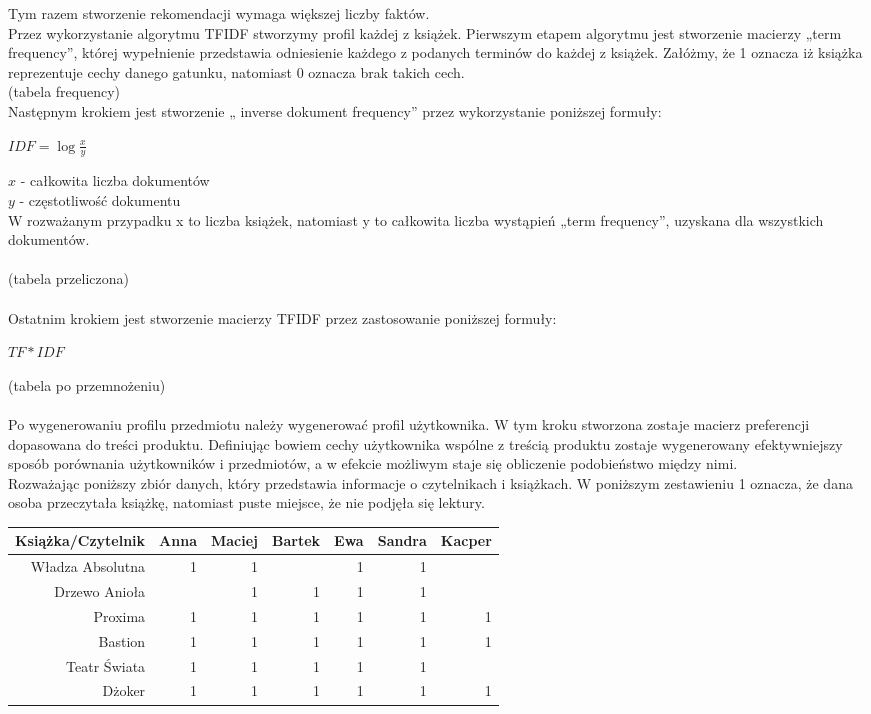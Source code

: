 \documentclass[12pt,a4paper]{report}
\begin{document}
Tym razem stworzenie rekomendacji wymaga większej liczby faktów.
\\Przez wykorzystanie algorytmu TFIDF stworzymy profil każdej z książek.
Pierwszym etapem algorytmu jest stworzenie macierzy „term frequency”, której wypełnienie przedstawia odniesienie każdego z podanych terminów do każdej z książek. Załóżmy, że 1 oznacza iż książka reprezentuje cechy danego gatunku, natomiast 0 oznacza brak takich cech. 
\\(tabela frequency)
\\Następnym krokiem jest stworzenie „ inverse dokument frequency” przez wykorzystanie poniższej formuły:
\begin{center}
$IDF = \log \frac{x}{y}$
\end{center}
$x$ - całkowita liczba dokumentów
\\$y$ - częstotliwość dokumentu
\\W rozważanym przypadku x to liczba książek, natomiast y to całkowita liczba wystąpień „term frequency”, uzyskana dla wszystkich dokumentów.
\\
\\(tabela przeliczona)
\\
\\Ostatnim krokiem jest stworzenie macierzy TFIDF przez zastosowanie poniższej formuły:
\begin{center}
$TF*IDF$
\end{center}
(tabela po przemnożeniu)
\\
\\Po wygenerowaniu profilu przedmiotu należy wygenerować profil użytkownika. W tym kroku stworzona zostaje macierz preferencji dopasowana do treści produktu. Definiując bowiem cechy użytkownika wspólne z treścią produktu zostaje wygenerowany efektywniejszy sposób porównania użytkowników i przedmiotów, a w efekcie możliwym staje się obliczenie podobieństwo między nimi.
\\Rozważając poniższy zbiór danych, który przedstawia informacje o czytelnikach i książkach. W poniższym zestawieniu 1 oznacza, że dana osoba przeczytała książkę, natomiast puste miejsce, że nie podjęła się lektury.
\begin{center}
\begin{tabular}{|r|r|r|r|r|r|r|} \hline
Książka/Czytelnik & Anna & Maciej & Bartek & Ewa & Sandra & Kacper \\
\hline \hline 
Władza Absolutna & 1 & 1 & & 1 & 1 &  \\
Drzewo Anioła &  & 1 & 1 & 1 & 1 &  \\
Proxima & 1 & 1 & 1 & 1 & 1 & 1 \\
Bastion & 1 & 1 & 1 & 1 & 1 & 1 \\
Teatr Świata & 1 & 1 & 1 & 1 & 1 &  \\
Dżoker & 1 & 1 & 1 & 1 & 1 & 1 \\
\hline
\end{tabular}
\end{center}
\end{document}
